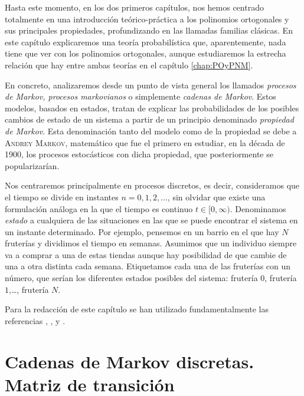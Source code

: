 %
%

Hasta este momento, en los dos primeros capítulos, nos hemos centrado totalmente en una introducción teórico-práctica a los polinomios ortogonales y sus principales propiedades, profundizando en las llamadas familias clásicas. En este capítulo explicaremos una teoría probabilística que, aparentemente, nada tiene que ver con los polinomios ortogonales, aunque estudiaremos la estrecha relación que hay entre ambas teorías en el capítulo \ref{chap:POyPNM}.

En concreto, analizaremos desde un punto de vista general los llamados \textit{procesos de Markov, procesos markovianos} o simplemente \textit{cadenas de Markov}. Estos modelos, basados en estados, tratan de explicar las probabilidades de los posibles cambios de estado de un sistema a partir de  un principio denominado \textit{propiedad de Markov}. Esta denominación tanto del modelo como de la propiedad se debe a \textsc{Andrey Markov}, matemático que fue el primero en estudiar, en la década de 1900, los procesos estocásticos con dicha propiedad, que posteriormente se popularizarían.

Nos centraremos principalmente en procesos discretos, es decir, consideramos que el tiempo se divide en instantes $n=0,1,2,\dots$, sin olvidar que existe una formulación análoga en la que el tiempo es continuo $t\in[0,\infty)$. Denominamos \textit{estado} a cualquiera de las situaciones en las que se puede encontrar el sistema en un instante determinado. Por ejemplo, pensemos en un barrio en el que hay $N$ fruterías y dividimos el tiempo en semanas. Asumimos que un individuo siempre va a comprar a una de estas tiendas aunque hay posibilidad de que cambie de una a otra distinta cada semana. Etiquetamos cada una de las fruterías con un número, que serían los diferentes estados posibles del sistema: frutería $0$, frutería $1$,\dots, frutería $N$.

Para la redacción de este capítulo se han utilizado fundamentalmente las referencias \cite[Ch. IV]{Ross}, \cite[Ch. II]{schoutens-2000}, \cite[Ch. II]{kulkarni-2012} y \cite[Ch. II, Section 2.1]{Manuel}.

\section{Cadenas de Markov discretas. Matriz de transición}


